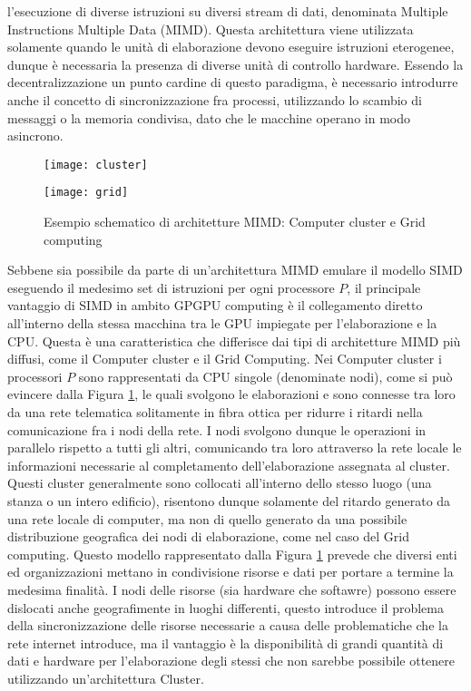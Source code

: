 l'esecuzione di diverse istruzioni su diversi stream di dati, denominata
Multiple Instructions Multiple Data (MIMD)\cite{duncan1990survey}.
Questa architettura viene utilizzata solamente quando le unità di elaborazione
devono eseguire istruzioni eterogenee, dunque è necessaria la presenza
di diverse unità di controllo hardware.
Essendo la decentralizzazione un punto cardine
di questo paradigma, è necessario introdurre anche il concetto di
sincronizzazione fra processi, utilizzando lo scambio di messaggi o
la memoria condivisa, dato che le macchine operano in modo asincrono.
\begin{figure}[t]
    \begin{minipage}[b]{.5\linewidth}
        \centering
        \texttt{[image: cluster]}
    \end{minipage}
    \begin{minipage}[b]{.5\linewidth}
        \centering
        \texttt{[image: grid]}
    \end{minipage}
    \caption{Esempio schematico di architetture MIMD:
        Computer cluster e Grid computing}
    \label{fig:cluster-grid}
\end{figure}
Sebbene sia possibile da parte di un'architettura MIMD emulare il modello
SIMD eseguendo il medesimo set di istruzioni per ogni processore $P$, il
principale vantaggio di SIMD in ambito GPGPU computing è il collegamento diretto
all'interno della stessa macchina tra le GPU impiegate per l'elaborazione e la 
CPU. Questa è una caratteristica che differisce dai tipi di
architetture MIMD più diffusi, come il Computer cluster e il Grid Computing.
Nei Computer cluster i processori $P$ sono rappresentati da CPU singole
(denominate nodi), come si può evincere dalla Figura \ref{fig:cluster-grid},
le quali svolgono le elaborazioni e sono connesse tra loro da una
rete telematica solitamente in fibra
ottica per ridurre i ritardi nella comunicazione fra i nodi della rete.
I nodi svolgono dunque le operazioni in parallelo rispetto a tutti gli altri,
comunicando tra loro attraverso la rete locale le informazioni necessarie al
completamento dell'elaborazione assegnata al cluster. Questi cluster
generalmente sono collocati all'interno dello stesso luogo
(una stanza o un intero edificio), risentono dunque solamente del ritardo generato
da una rete locale di computer, ma non di quello generato da una
possibile distribuzione geografica dei nodi di elaborazione, come nel caso
del Grid computing. Questo modello rappresentato dalla Figura
\ref{fig:cluster-grid} 
prevede che diversi enti ed organizzazioni mettano in condivisione risorse e
dati per portare a termine la medesima finalità.
I nodi delle risorse (sia hardware che softawre) possono essere
dislocati anche geografimente in luoghi differenti, questo introduce il problema
della sincronizzazione delle risorse necessarie a causa delle problematiche
che la rete internet introduce, ma il vantaggio è la disponibilità di grandi
quantità di dati e hardware per l'elaborazione degli stessi che non sarebbe
possibile ottenere utilizzando un'architettura Cluster.


